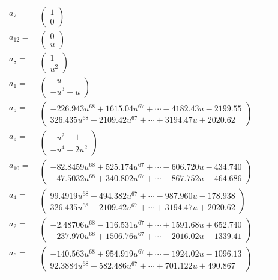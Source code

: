 \documentclass[1p]{elsarticle_modified}
\theoremstyle{definition}
\begin{document}
\begin{tabular}{m{7pt} m{180pt} m{7pt} m{180pt} }
\flushright $a_{7}=$&$\begin{pmatrix}1\\0\end{pmatrix}$ \\
\flushright $a_{12}=$&$\begin{pmatrix}0\\u\end{pmatrix}$ \\
\flushright $a_{8}=$&$\begin{pmatrix}1\\u^2\end{pmatrix}$ \\
\flushright $a_{1}=$&$\begin{pmatrix}- u\\- u^3+u\end{pmatrix}$ \\
\flushright $a_{5}=$&$\begin{pmatrix}-226.943 u^{68}+1615.04 u^{67}+\cdots-4182.43 u-2199.55\\326.435 u^{68}-2109.42 u^{67}+\cdots+3194.47 u+2020.62\end{pmatrix}$ \\
\flushright $a_{9}=$&$\begin{pmatrix}- u^2+1\\- u^4+2 u^2\end{pmatrix}$ \\
\flushright $a_{10}=$&$\begin{pmatrix}-82.8459 u^{68}+525.174 u^{67}+\cdots-606.720 u-434.740\\-47.5032 u^{68}+340.802 u^{67}+\cdots-867.752 u-464.686\end{pmatrix}$ \\
\flushright $a_{4}=$&$\begin{pmatrix}99.4919 u^{68}-494.382 u^{67}+\cdots-987.960 u-178.938\\326.435 u^{68}-2109.42 u^{67}+\cdots+3194.47 u+2020.62\end{pmatrix}$ \\
\flushright $a_{2}=$&$\begin{pmatrix}-2.48706 u^{68}-116.531 u^{67}+\cdots+1591.68 u+652.740\\-237.970 u^{68}+1506.76 u^{67}+\cdots-2016.02 u-1339.41\end{pmatrix}$ \\
\flushright $a_{6}=$&$\begin{pmatrix}-140.563 u^{68}+954.919 u^{67}+\cdots-1924.02 u-1096.13\\92.3884 u^{68}-582.486 u^{67}+\cdots+701.122 u+490.867\end{pmatrix}$ \\

\end{tabular}
\end{document}
